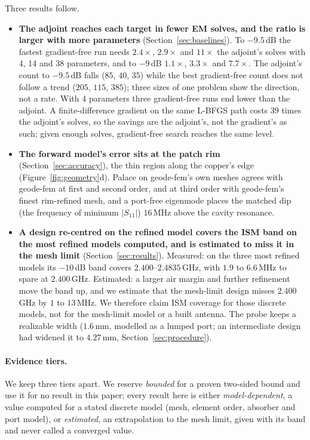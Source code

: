 \documentclass{anvil-paper}
\begin{document}
Three results follow.
\begin{itemize}
  \item \textbf{The adjoint reaches each target in fewer EM solves, and the
  ratio is larger with more parameters} (Section~\ref{sec:baselines}). To
  $-9.5$\,dB the fastest gradient-free run needs $2.4\times$, $2.9\times$ and
  $11\times$ the adjoint's solves with 4, 14 and 38 parameters, and to
  $-9$\,dB $1.1\times$, $3.3\times$ and $7.7\times$. The adjoint's count to
  $-9.5$\,dB falls ($85$, $40$, $35$) while the best gradient-free count does
  not follow a trend ($205$, $115$, $385$); three sizes of one problem show
  the direction, not a rate. With 4 parameters three gradient-free runs end
  lower than the adjoint. A finite-difference gradient on the same L-BFGS path
  costs $39$ times the adjoint's solves, so the savings are the adjoint's, not
  the gradient's as such; given enough solves, gradient-free search reaches
  the same level.
  \item \textbf{The forward model's error sits at the patch rim}
  (Section~\ref{sec:accuracy}), the thin region along the copper's edge
  (Figure~\ref{fig:geometry}d). Palace on geode-fem's own meshes agrees with
  geode-fem at first and second order, and at third order with geode-fem's
  finest rim-refined mesh, and a port-free eigenmode places the matched dip
  (the frequency of minimum $|S_{11}|$) $16$\,MHz above the cavity resonance.
  \item \textbf{A design re-centred on the refined model covers the ISM band
  on the most refined models computed, and is estimated to miss it in the
  mesh limit} (Section~\ref{sec:results}). Measured: on the three most refined
  models its $-10$\,dB band covers $2.400$--$2.4835$\,GHz, with $1.9$ to
  $6.6$\,MHz to spare at $2.400$\,GHz. Estimated: a larger air margin and
  further refinement move the band up, and we estimate that the mesh-limit
  design misses $2.400$\,GHz by $1$ to $13$\,MHz. We therefore claim ISM
  coverage for those discrete models, not for the mesh-limit model or a built
  antenna. The probe keeps a realizable width ($1.6$\,mm, modelled as a lumped
  port; an intermediate design had widened it to $4.27$\,mm,
  Section~\ref{sec:procedure}).
\end{itemize}

\paragraph{Evidence tiers.}
We keep three tiers apart. We reserve \emph{bounded} for a proven two-sided
bound and use it for no result in this paper; every result here is either
\emph{model-dependent}, a value computed for a stated discrete model (mesh,
element order, absorber and port model), or \emph{estimated}, an
extrapolation to the mesh limit, given with its band and never called a
converged value.
\end{document}
